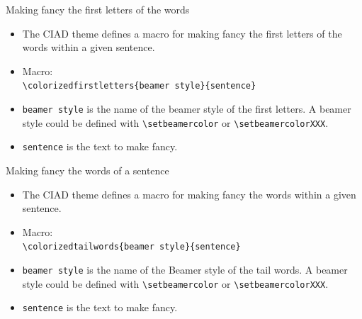\documentclass[english,sectioncirclenumberstyle]{ciadbeamer}
\begin{document}
\begin{frame}{{Making fancy} the first letters of the words}
	\begin{itemize}
	\item The CIAD theme defines a macro for making fancy the first letters of the words within a given sentence.
	\item Macro:\\
		\texttt{{\textbackslash}colorizedfirstletters\{beamer style\}\{sentence\}}
	\item \texttt{beamer style} is the name of the beamer style of the first letters. A beamer style could be defined with \texttt{{\textbackslash}setbeamercolor} or \texttt{{\textbackslash}setbeamercolorXXX}.
	\item \texttt{sentence} is the text to make fancy.
	\end{itemize}
	\begin{example}
	\end{example}
\end{frame}

\begin{frame}{{Making fancy} the words of a sentence}
	\begin{itemize}
	\item The CIAD theme defines a macro for making fancy the words within a given sentence.
	\item Macro:\\
		\texttt{{\textbackslash}colorizedtailwords\{beamer style\}\{sentence\}}
	\item \texttt{beamer style} is the name of the Beamer style of the tail words. A beamer style could be defined with \texttt{{\textbackslash}setbeamercolor} or \texttt{{\textbackslash}setbeamercolorXXX}.
	\item \texttt{sentence} is the text to make fancy.
	\end{itemize}
	\begin{example}
	\end{example}
\end{frame}
\end{document}
